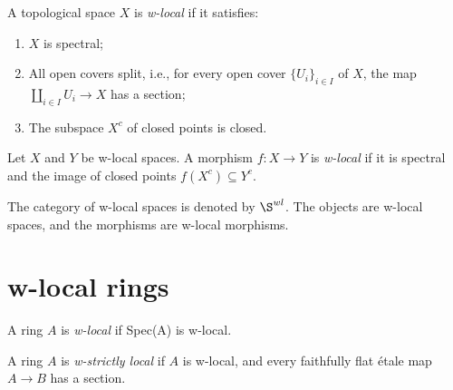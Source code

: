 \begin{definition}
    \label{def:w-local-space}
    A topological space \(X\) is \emph{w-local} if it satisfies:
    \begin{enumerate}
        \item \(X\) is spectral;
        \item All open covers split, i.e., for every open cover \(\{U_i\}_{i \in I}\) of \(X\), the map \(\coprod_{i \in I} U_i \to X\) has a section;
        \item The subspace \(X^c\) of closed points is closed.
    \end{enumerate}
\end{definition}

\begin{definition}
    Let \(X\) and \(Y\) be w-local spaces. A morphism \(f: X \to Y\) is \emph{w-local} if it is spectral and the image of closed points \(f(X^c) \subseteq Y^c\).
    \label{def:w-local-morphism}
\end{definition}

\begin{definition}
    The category of w-local spaces is denoted by \(\S^{wl}\). The objects are w-local spaces, and the morphisms are w-local morphisms.
    \label{def:w-local-space-category}
\end{definition}



\section{w-local rings}

\begin{definition}
    A ring \(A\) is \emph{w-local} if Spec(A) is w-local.
    \label{def:w-local-ring}
\end{definition}

\begin{definition}
    A ring \(A\) is \emph{w-strictly local} if \(A\) is w-local, and every faithfully flat \'etale map \(A \to B\) has a section.
    \label{def:w-strictly-local-ring}
\end{definition}

